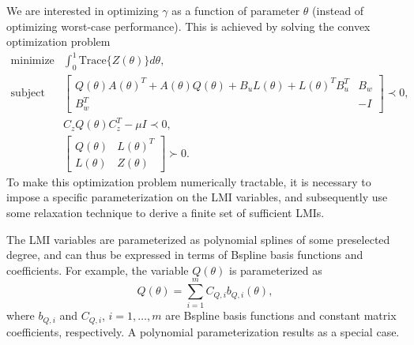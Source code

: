 \documentclass{article}
\newcommand{\ppar}{\theta}                          %
\begin{document}

We are interested in optimizing $\gamma$ as a function of parameter $\ppar$ (instead of optimizing worst-case performance). This is achieved by solving the convex optimization problem
\begin{eqnarray*}
 \text{minimize} & \int_0^1 \text{Trace}\{Z(\ppar)\} d\ppar, \\
 \text{subject to} & \left[ \begin{array}{cc} Q(\ppar)A(\ppar)^T + A(\ppar)Q(\ppar) + B_u L(\ppar) + L(\ppar)^T B_u^T & B_w \\ B_w^T & -I \end{array} \right] \prec 0, \\
 & C_z Q(\ppar) C_z^T - \mu I \prec 0, \\
 & \left[ \begin{array}{cc} Q(\ppar) & L(\ppar)^T \\ L(\ppar) & Z(\ppar) \end{array} \right] \succ 0.
\end{eqnarray*}
To make this optimization problem numerically tractable, it is necessary to impose a specific parameterization on the LMI variables, and subsequently use some relaxation technique to derive a finite set of sufficient LMIs.

The LMI variables are parameterized as polynomial splines of some preselected degree, and can thus be expressed in terms of Bspline basis functions and coefficients. For example, the variable $Q(\ppar)$ is parameterized as
\begin{equation*}
	Q(\ppar) = \sum_{i=1}^m C_{Q,i} b_{Q,i}(\ppar),
\end{equation*}
where $b_{Q,i}$ and $C_{Q,i}$, $i = 1,\dots,m$ are Bspline basis functions and constant matrix coefficients, respectively. A polynomial parameterization results as a special case.
\end{document}
